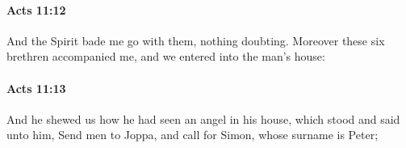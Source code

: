 		\paragraph{Acts 11:12} %
			\label{ACTS-11-12}

			And the Spirit bade me go with them, nothing doubting.  Moreover these six brethren accompanied me, and we entered into the man's house:

			\begin{framed}
			\scriptsize
				\begin{compactdesc}
					\item[SBLG] 
				\end{compactdesc}
			\end{framed}

		\paragraph{Acts 11:13} %
			\label{ACTS-11-13}

			And he shewed us how he had seen an angel in his house, which stood and said unto him, Send men to Joppa, and call for Simon, whose surname is Peter;


